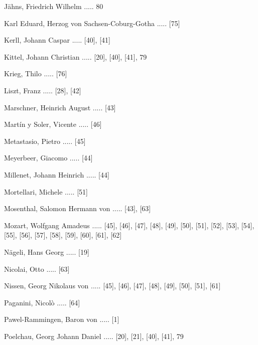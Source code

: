 \documentclass[a4paper, twocolumn, 11pt]{book}
\begin{document}
\newline 
Jähns, Friedrich Wilhelm ..... 80

\newline 
Karl Eduard, Herzog von Sachsen-Coburg-Gotha ..... [75]

\newline 
Kerll, Johann Caspar ..... [40], [41]

\newline 
Kittel, Johann Christian ..... [20], [40], [41], 79

\newline 
Krieg, Thilo ..... [76]

\newline 
Liszt, Franz ..... [28], [42]

\newline 
Marschner, Heinrich August ..... [43]

\newline 
Martín y Soler, Vicente ..... [46]

\newline 
Metastasio, Pietro ..... [45]

\newline 
Meyerbeer, Giacomo ..... [44]

\newline 
Millenet, Johann Heinrich ..... [44]

\newline 
Mortellari, Michele ..... [51]

\newline 
Mosenthal, Salomon Hermann von ..... [43], [63]

\newline 
Mozart, Wolfgang Amadeus ..... [45], [46], [47], [48], [49], [50], [51], [52], [53], [54], [55], [56], [57], [58], [59], [60], [61], [62]

\newline 
Nägeli, Hans Georg ..... [19]

\newline 
Nicolai, Otto ..... [63]

\newline 
Nissen, Georg Nikolaus von ..... [45], [46], [47], [48], [49], [50], [51], [61]

\newline 
Paganini, Nicolò ..... [64]

\newline 
Pawel-Rammingen, Baron von ..... [1]

\newline 
Poelchau, Georg Johann Daniel ..... [20], [21], [40], [41], 79
\end{document}
